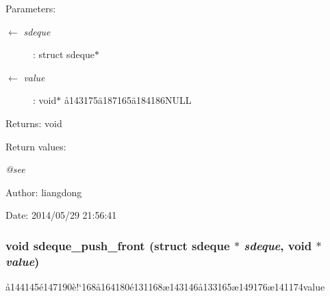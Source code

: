 \begin{Desc}
\item[Parameters:]
\begin{description}
\item[\mbox{$\leftarrow$} {\em sdeque}]: struct sdeque$\ast$ \item[\mbox{$\leftarrow$} {\em value}]: void$\ast$ \aa{}143175\"{a}187165\"{a}184186NULL \end{description}
\end{Desc}
\begin{Desc}
\item[Returns:]void \end{Desc}
\begin{Desc}
\item[Return values:]
\begin{description}
\item[{\em @see}]\end{description}
\end{Desc}
\begin{Desc}
\item[Author:]liangdong \end{Desc}
\begin{Desc}
\item[Date:]2014/05/29 21:56:41 \end{Desc}
\subsubsection{\setlength{\rightskip}{0pt plus 5cm}void sdeque\_\-push\_\-front (struct sdeque $\ast$ {\em sdeque}, void $\ast$ {\em value})}\label{sdeque_8c_a2}


\aa{}144145\'{e}147190\`{e}!`168\aa{}164180\'{e}131168\ae{}143146\aa{}133165\ae{}149176\ae{}141174value 

